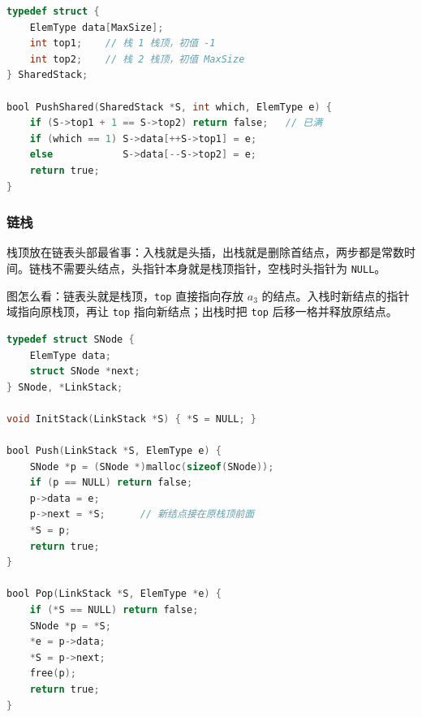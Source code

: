 \begin{lstlisting}[language=C]
typedef struct {
    ElemType data[MaxSize];
    int top1;    // 栈 1 栈顶，初值 -1
    int top2;    // 栈 2 栈顶，初值 MaxSize
} SharedStack;

bool PushShared(SharedStack *S, int which, ElemType e) {
    if (S->top1 + 1 == S->top2) return false;   // 已满
    if (which == 1) S->data[++S->top1] = e;
    else            S->data[--S->top2] = e;
    return true;
}
\end{lstlisting}

\subsubsection*{链栈}

栈顶放在链表头部最省事：入栈就是头插，出栈就是删除首结点，两步都是常数时间。链栈不需要头结点，头指针本身就是栈顶指针，空栈时头指针为 \texttt{NULL}。

\begin{center}
\end{center}
{\footnotesize\noindent 图怎么看：链表头就是栈顶，\texttt{top} 直接指向存放 $a_3$ 的结点。入栈时新结点的指针域指向原栈顶，再让 \texttt{top} 指向新结点；出栈时把 \texttt{top} 后移一格并释放原结点。\par}

\begin{lstlisting}[language=C]
typedef struct SNode {
    ElemType data;
    struct SNode *next;
} SNode, *LinkStack;

void InitStack(LinkStack *S) { *S = NULL; }

bool Push(LinkStack *S, ElemType e) {
    SNode *p = (SNode *)malloc(sizeof(SNode));
    if (p == NULL) return false;
    p->data = e;
    p->next = *S;      // 新结点接在原栈顶前面
    *S = p;
    return true;
}

bool Pop(LinkStack *S, ElemType *e) {
    if (*S == NULL) return false;
    SNode *p = *S;
    *e = p->data;
    *S = p->next;
    free(p);
    return true;
}
\end{lstlisting}

